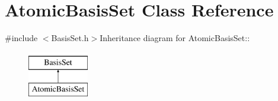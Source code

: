 \hypertarget{classJKBuilder_1_1AtomicBasisSet}{
\section{AtomicBasisSet Class Reference}
\label{classJKBuilder_1_1AtomicBasisSet}
}


{\ttfamily \#include $<$BasisSet.h$>$}Inheritance diagram for AtomicBasisSet::\begin{figure}[H]
\begin{center}
\leavevmode
\includegraphics[height=2cm]{classJKBuilder_1_1AtomicBasisSet}
\end{center}
\end{figure}
